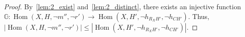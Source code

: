 \begin{proof}
    By~\autoref{lem:2_exist} and~\autoref{lem:2_distinct}, there exists an injective function $\mathbb{G} : \operatorname{Hom}(X, H, \lnot m'', \lnot r') \to \operatorname{Hom}(X, H', \lnot h_{R_XH'}, \lnot h_{CH'})$. Thus, $|\operatorname{Hom}(X, H, \lnot m'', \lnot r')| \leq |\operatorname{Hom}(X, H', \lnot h_{R_XH'}, \lnot h_{CH'})|$.

\end{proof}  








          

    
